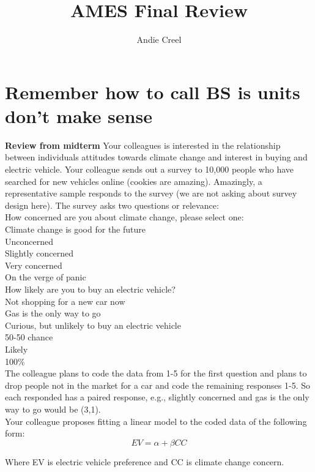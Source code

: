 \documentclass{article}
\title{AMES Final Review}
\author{Andie Creel}
\begin{document}
\maketitle

\section{Remember how to call BS is units don't make sense}

\textbf{Review from midterm}
Your colleagues is interested in the relationship between individuals attitudes towards climate change and interest in buying and electric vehicle. Your colleague sends out a survey to 10,000 people who have searched for new vehicles online (cookies are amazing). Amazingly, a representative sample responds to the survey (we are not asking about survey design here). The survey asks two questions or relevance: \\

How concerned are you about climate change, please select one:\\
        Climate change is good for the future\\
	Unconcerned \\
	Slightly concerned\\
	Very concerned\\
	On the verge of panic\\

How likely are you to buy an electric vehicle?\\
	Not shopping for a new car now	\\
	Gas is the only way to go\\
	Curious, but unlikely to buy an electric vehicle\\
	50-50 chance\\
	Likely\\
	100\% \\ 

The colleague plans to code the data from 1-5 for the first question and plans to drop people not in the market for a car and code the remaining responses 1-5. So each responded has a paired response, e.g., slightly concerned and gas is the only way to go would be (3,1).  \\

Your colleague proposes fitting a linear model to the coded data of the following form:
\[EV = \alpha + \beta CC\]

Where EV is electric vehicle preference and CC is climate change concern. 
\end{document}
